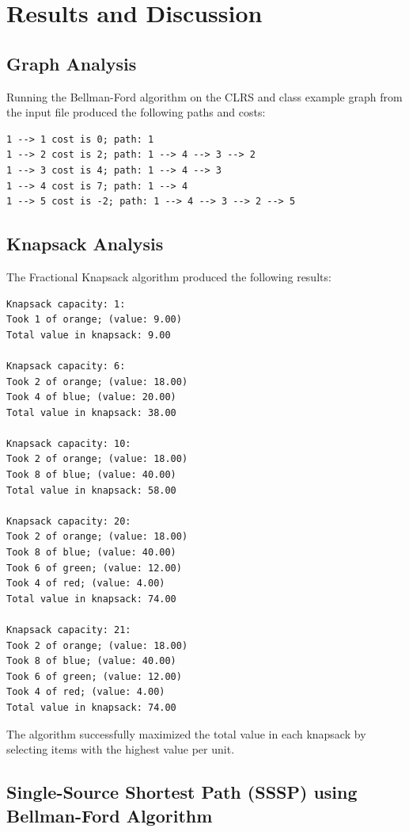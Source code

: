 \documentclass[a4paper,12pt]{article}
\begin{document}
\section{Results and Discussion}
\subsection{Graph Analysis}
Running the Bellman-Ford algorithm on the CLRS and class example graph from the input file produced the following paths and costs:
\begin{verbatim}
1 --> 1 cost is 0; path: 1
1 --> 2 cost is 2; path: 1 --> 4 --> 3 --> 2
1 --> 3 cost is 4; path: 1 --> 4 --> 3
1 --> 4 cost is 7; path: 1 --> 4
1 --> 5 cost is -2; path: 1 --> 4 --> 3 --> 2 --> 5
\end{verbatim}

\subsection{Knapsack Analysis}
The Fractional Knapsack algorithm produced the following results:
\begin{verbatim}
Knapsack capacity: 1:
Took 1 of orange; (value: 9.00)
Total value in knapsack: 9.00

Knapsack capacity: 6:
Took 2 of orange; (value: 18.00)
Took 4 of blue; (value: 20.00)
Total value in knapsack: 38.00

Knapsack capacity: 10:
Took 2 of orange; (value: 18.00)
Took 8 of blue; (value: 40.00)
Total value in knapsack: 58.00

Knapsack capacity: 20:
Took 2 of orange; (value: 18.00)
Took 8 of blue; (value: 40.00)
Took 6 of green; (value: 12.00)
Took 4 of red; (value: 4.00)
Total value in knapsack: 74.00

Knapsack capacity: 21:
Took 2 of orange; (value: 18.00)
Took 8 of blue; (value: 40.00)
Took 6 of green; (value: 12.00)
Took 4 of red; (value: 4.00)
Total value in knapsack: 74.00

\end{verbatim}

The algorithm successfully maximized the total value in each knapsack by selecting items with the highest value per unit.

\subsection{Single-Source Shortest Path (SSSP) using Bellman-Ford Algorithm}
\end{document}
